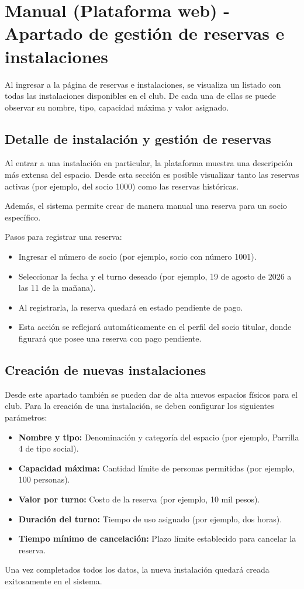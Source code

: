 \section{Manual (Plataforma web) - Apartado de gestión de reservas e instalaciones}

Al ingresar a la página de reservas e instalaciones, se visualiza un listado con todas las instalaciones disponibles en el club. De cada una de ellas se puede observar su nombre, tipo, capacidad máxima y valor asignado.

\subsection{Detalle de instalación y gestión de reservas}
Al entrar a una instalación en particular, la plataforma muestra una descripción más extensa del espacio. Desde esta sección es posible visualizar tanto las reservas activas (por ejemplo, del socio 1000) como las reservas históricas.

Además, el sistema permite crear de manera manual una reserva para un socio específico. 

Pasos para registrar una reserva:
\begin{itemize}
    \item Ingresar el número de socio (por ejemplo, socio con número 1001).
    \item Seleccionar la fecha y el turno deseado (por ejemplo, 19 de agosto de 2026 a las 11 de la mañana).
    \item Al registrarla, la reserva quedará en estado pendiente de pago.
    \item Esta acción se reflejará automáticamente en el perfil del socio titular, donde figurará que posee una reserva con pago pendiente.
\end{itemize}

\subsection{Creación de nuevas instalaciones}
Desde este apartado también se pueden dar de alta nuevos espacios físicos para el club. Para la creación de una instalación, se deben configurar los siguientes parámetros:

\begin{itemize}
    \item \textbf{Nombre y tipo:} Denominación y categoría del espacio (por ejemplo, Parrilla 4 de tipo social).
    \item \textbf{Capacidad máxima:} Cantidad límite de personas permitidas (por ejemplo, 100 personas).
    \item \textbf{Valor por turno:} Costo de la reserva (por ejemplo, 10 mil pesos).
    \item \textbf{Duración del turno:} Tiempo de uso asignado (por ejemplo, dos horas).
    \item \textbf{Tiempo mínimo de cancelación:} Plazo límite establecido para cancelar la reserva.
\end{itemize}

Una vez completados todos los datos, la nueva instalación quedará creada exitosamente en el sistema.
